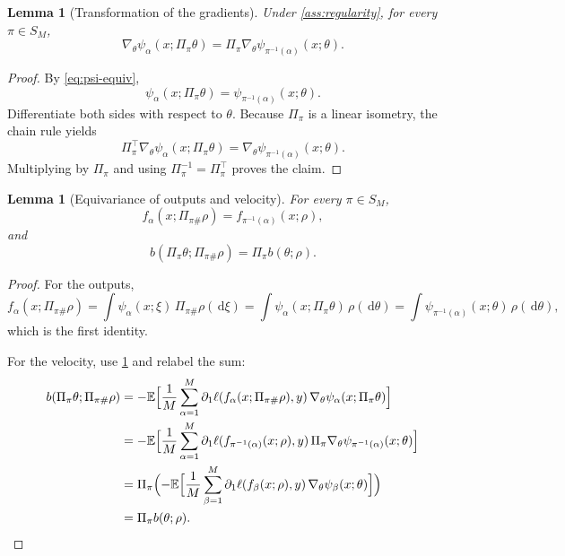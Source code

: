 \documentclass[11pt]{article}
\newtheorem{lemma}[theorem]{Lemma}
\theoremstyle{definition}
\newcommand{\E}{\mathbb{E}}
\newcommand{\dd}{\,\mathrm{d}}
\begin{document}
\begin{lemma}[Transformation of the gradients]
\label{lem:gradient-equiv}
Under \cref{ass:regularity}, for every $\pi \in S_M$,
\[
  \nabla_\theta \psi_\alpha(x;\Pi_\pi \theta)
  =
  \Pi_\pi \nabla_\theta \psi_{\pi^{-1}(\alpha)}(x;\theta).
\]
\end{lemma}

\begin{proof}
By \eqref{eq:psi-equiv},
\[
  \psi_\alpha(x;\Pi_\pi \theta)=\psi_{\pi^{-1}(\alpha)}(x;\theta).
\]
Differentiate both sides with respect to $\theta$.
Because $\Pi_\pi$ is a linear isometry, the chain rule yields
\[
  \Pi_\pi^\top \nabla_\theta \psi_\alpha(x;\Pi_\pi \theta)
  =
  \nabla_\theta \psi_{\pi^{-1}(\alpha)}(x;\theta).
\]
Multiplying by $\Pi_\pi$ and using $\Pi_\pi^{-1}=\Pi_\pi^\top$ proves the claim.
\end{proof}

\begin{lemma}[Equivariance of outputs and velocity]
\label{lem:velocity-equiv}
For every $\pi \in S_M$,
\[
  f_\alpha(x;\Pi_{\pi\#}\rho)
  =
  f_{\pi^{-1}(\alpha)}(x;\rho),
\]
and
\[
  b(\Pi_\pi \theta;\Pi_{\pi\#}\rho)
  =
  \Pi_\pi b(\theta;\rho).
\]
\end{lemma}

\begin{proof}
For the outputs,
\[
  f_\alpha(x;\Pi_{\pi\#}\rho)
  =
  \int \psi_\alpha(x;\xi)\,\Pi_{\pi\#}\rho(\dd \xi)
  =
  \int \psi_\alpha(x;\Pi_\pi \theta)\,\rho(\dd \theta)
  =
  \int \psi_{\pi^{-1}(\alpha)}(x;\theta)\,\rho(\dd \theta),
\]
which is the first identity.

For the velocity, use \cref{lem:gradient-equiv} and relabel the sum:
\begin{align*}
  b(\Pi_\pi \theta;\Pi_{\pi\#}\rho)
  &=
  -
  \E \Bigl[
    \frac1M \sum_{\alpha=1}^M
    \partial_1 \ell(f_\alpha(x;\Pi_{\pi\#}\rho),y)\,
    \nabla_\theta \psi_\alpha(x;\Pi_\pi \theta)
  \Bigr]
  \\
  &=
  -
  \E \Bigl[
    \frac1M \sum_{\alpha=1}^M
    \partial_1 \ell(f_{\pi^{-1}(\alpha)}(x;\rho),y)\,
    \Pi_\pi \nabla_\theta \psi_{\pi^{-1}(\alpha)}(x;\theta)
  \Bigr]
  \\
  &=
  \Pi_\pi
  \Bigl(
    -
    \E \Bigl[
      \frac1M \sum_{\beta=1}^M
      \partial_1 \ell(f_\beta(x;\rho),y)\,
      \nabla_\theta \psi_\beta(x;\theta)
    \Bigr]
  \Bigr)
  \\
  &=
  \Pi_\pi b(\theta;\rho).
\end{align*}
\end{proof}
\end{document}
